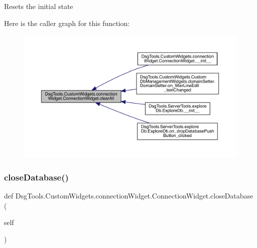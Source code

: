\begin{DoxyVerb}Resets the initial state
\end{DoxyVerb}
 Here is the caller graph for this function\+:
\nopagebreak
\begin{figure}[H]
\begin{center}
\leavevmode
\includegraphics[width=350pt]{class_dsg_tools_1_1_custom_widgets_1_1connection_widget_1_1_connection_widget_a08811cc473d6f2a2c4775a6f93e825e4_icgraph}
\end{center}
\end{figure}
\mbox{\label{class_dsg_tools_1_1_custom_widgets_1_1connection_widget_1_1_connection_widget_a5db934d202ff7387e420a05fbf1508ed}} 
\subsubsection{\texorpdfstring{close\+Database()}{closeDatabase()}}
{\footnotesize\ttfamily def Dsg\+Tools.\+Custom\+Widgets.\+connection\+Widget.\+Connection\+Widget.\+close\+Database (\begin{DoxyParamCaption}\item[{}]{self }\end{DoxyParamCaption})}

